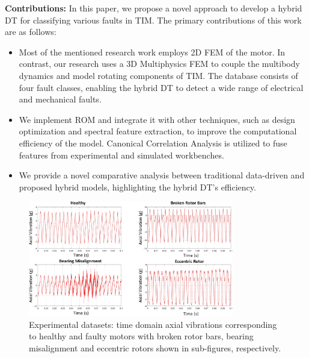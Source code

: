 \documentclass[a4paper,conference]{IEEEtran}
\begin{document}
\textbf{Contributions:} In this paper, we propose a novel approach to develop a hybrid DT for classifying various faults in TIM. The primary contributions of this work are as follows:
\begin{itemize}
    \item Most of the mentioned research work employs 2D FEM of the motor. In contrast, our research uses a 3D Multiphysics FEM to couple the multibody dynamics and model rotating components of TIM. The database consists of four fault classes, enabling the hybrid DT to detect a wide range of electrical and mechanical faults. 
    \item We implement ROM and integrate it with other techniques, such as design optimization and spectral feature extraction, to improve the computational efficiency of the model. Canonical Correlation Analysis is utilized to fuse features from experimental and simulated workbenches. 
    \item We provide a novel comparative analysis between traditional data-driven and proposed hybrid models, highlighting the hybrid DT's efficiency.
\end{itemize}
\begin{figure}[h!]
    \centering
\includegraphics[width=0.8\textwidth]{Figs/attempt22.png}
\caption{Experimental datasets: time domain axial vibrations corresponding to healthy and faulty motors with broken rotor bars, bearing misalignment and eccentric rotors shown in sub-figures, respectively.}
    \label{fig:flowchart}
\end{figure}
\end{document}
